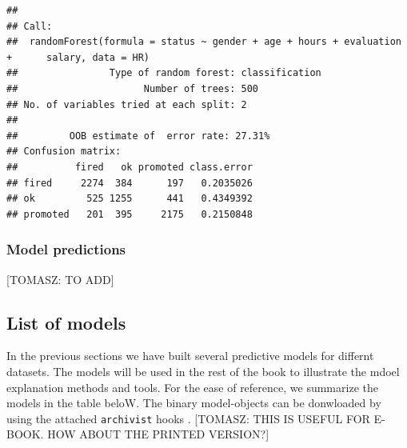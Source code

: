 \documentclass[12pt,]{krantz}
\theoremstyle{definition}
\theoremstyle{definition}
\theoremstyle{definition}
\theoremstyle{remark}
\begin{document}
\begin{verbatim}
## 
## Call:
##  randomForest(formula = status ~ gender + age + hours + evaluation +      salary, data = HR) 
##                Type of random forest: classification
##                      Number of trees: 500
## No. of variables tried at each split: 2
## 
##         OOB estimate of  error rate: 27.31%
## Confusion matrix:
##          fired   ok promoted class.error
## fired     2274  384      197   0.2035026
## ok         525 1255      441   0.4349392
## promoted   201  395     2175   0.2150848
\end{verbatim}

\hypertarget{predictions_HR}{%
\subsubsection{Model predictions}\label{predictions_HR}}

{[}TOMASZ: TO ADD{]}

\hypertarget{ListOfModels}{%
\subsection{List of models}\label{ListOfModels}}

In the previous sections we have built several predictive models for
differnt datasets. The models will be used in the rest of the book to
illustrate the mdoel explanation methods and tools. For the ease of
reference, we summarize the models in the table beloW. The binary
model-objects can be donwloaded by using the attached \texttt{archivist}
hooks \citep{archivist}. {[}TOMASZ: THIS IS USEFUL FOR E-BOOK. HOW ABOUT
THE PRINTED VERSION?{]}
\end{document}
